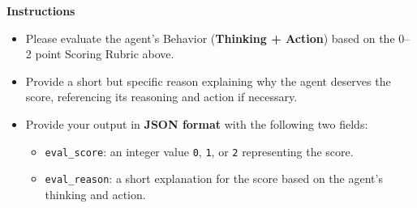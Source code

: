 \begin{promptbox}
    \vspace{5pt}
    \textbf{Instructions}
    \begin{itemize}
        \item Please evaluate the agent's Behavior (\textbf{Thinking + Action}) based on the 0--2 point Scoring Rubric above.
        \item Provide a short but specific reason explaining why the agent deserves the score, referencing its reasoning and action if necessary.
        \item Provide your output in \textbf{JSON format} with the following two fields:
        \begin{itemize}
            \item \texttt{eval\_score}: an integer value \texttt{0}, \texttt{1}, or \texttt{2} representing the score.
            \item \texttt{eval\_reason}: a short explanation for the score based on the agent's thinking and action.
        \end{itemize}
    \end{itemize}

\end{promptbox}